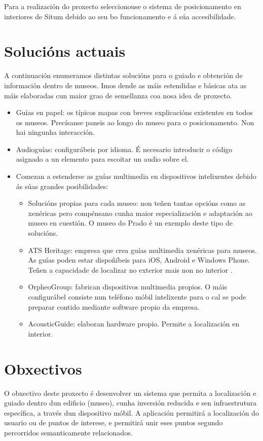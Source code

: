 Para a realización do proxecto seleccionouse o sistema de posicionamento en interiores de Situm debido ao seu bo funcionamento e á súa accesibilidade.

\section{Solucións actuais}

A continuación enumeramos distintas solucións para o guiado e obtención de información dentro de museos. Imos dende as máis estendidas e básicas ata as máis elaboradas cun maior grao de semellanza coa nosa idea de proxecto.
\begin{itemize}
	\item Guías en papel: os típicos mapas con breves explicacións existentes en todos os museos. Precísanse paneis ao longo do museo para o posicionamento. Non hai ningunha interacción.
	\item Audioguías: configurábeis por idioma. É necesario introducir o código asignado a un elemento para escoitar un audio sobre el.
	\item Comezan a estenderse as guías multimedia en dispositivos intelixentes debido ás súas grandes posibilidades:
	\begin{itemize}
		\item Solucións propias para cada museo: non teñen tantas opcións como as xenéricas pero compénsano cunha maior especialización e adaptación ao museo en cuestión. O museo do Prado é un exemplo deste tipo de solucións.
		\item ATS Heritage: empresa que crea guías multimedia xenéricas para museos. As guías poden estar dispoñíbeis para iOS, Android e Windows Phone. Teñen a capacidade de localizar no exterior mais non no interior \cite{atsHeritage}.
		\item OrpheoGroup: fabrican dispositivos multimedia propios. O máis configurábel consiste nun teléfono móbil intelixente para o cal se pode preparar contido mediante software propio da empresa.
		\item AcousticGuide: elaboran hardware propio. Permite a localización en interior.
	\end{itemize}
\end{itemize}

\section{Obxectivos}

O obxectivo deste proxecto é desenvolver un sistema que permita a localización e guiado dentro dun edificio (museo), cunha inversión reducida e sen infraestrutura específica, a través dun dispositivo móbil. A aplicación permitirá a localización do usuario ou de puntos de interese, e permitirá unir eses puntos segundo percorridos semanticamente relacionados.

